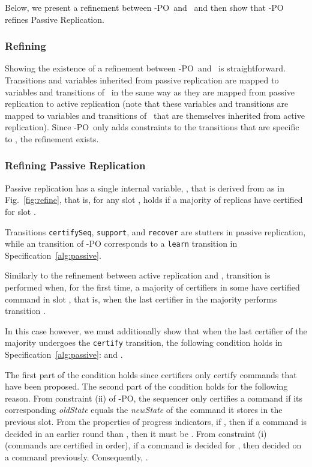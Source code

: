 Below, we present a refinement between \multiconsensus-PO\ and \multiconsensus\ and then show that \multiconsensus-PO refines Passive Replication.

\subsubsection{Refining \multiconsensus}

Showing the existence of a refinement between \multiconsensus-PO\
and \multiconsensus\ is straightforward.  Transitions and variables
inherited from passive replication are mapped to variables and
transitions of \multiconsensus\ in the same way as they are mapped
from passive replication to active replication (note that these
variables and transitions are mapped to variables and transitions
of \multiconsensus\ that are themselves inherited from active
replication).  Since \multiconsensus-PO\ only adds constraints to
the transitions that are specific to \multiconsensus, the refinement
exists.

\subsubsection{Refining Passive Replication}
Passive replication has a single internal variable, ,
that is derived from  as in Fig.~\ref{fig:refine},
that is, for any slot ,  holds if a majority
of replicas have certified  for slot .

Transitions \texttt{certifySeq}, \texttt{support{\Round}}, and
\texttt{recover} are stutters in passive replication, while an
\texttt{\observedecision} transition of \multiconsensus-PO
corresponds to a \texttt{learn} transition in
Specification~\ref{alg:passive}.

Similarly to the refinement between active replication and
\multiconsensus, transition  is performed when, for the first
time, a majority of certifiers in some {\round}  have certified
command  in slot , that is, when the last certifier
 in the majority performs transition .  

In this case however, we
must additionally show that when the last certifier of the majority
undergoes the \texttt{certify} transition, the following condition
holds in Specification~\ref{alg:passive}: 
and .  

The first
part of the condition holds since certifiers only certify commands
that have been proposed.  The second part of the condition holds
for the following reason.  From constraint (ii) of \multiconsensus-PO, the sequencer only certifies
a command if its corresponding \textit{oldState} equals the \textit{newState} of the command it stores in the previous slot.
From the properties of progress indicators, if , then if a command is decided
in an earlier round than , then it must be .  From constraint (i) (commands are certified in order), if a command is decided for , then
 decided on a command previously.  Consequently,  .

